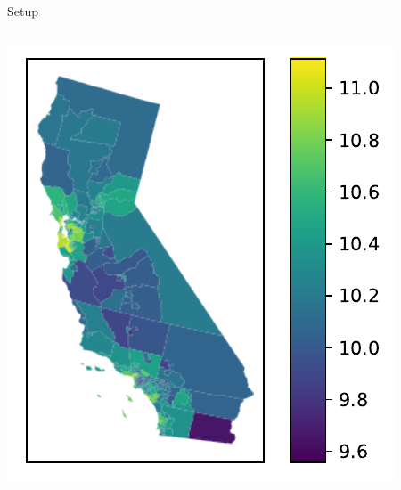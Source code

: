 \documentclass[10.5pt, aspectratio=169]{beamer} %
\begin{document}
\begin{frame}{Setup}
{\begin{columns}
\begin{column}{0.35\textwidth}
\centering
\includegraphics[width=0.95\linewidth]{example_income}
\end{column}

\end{columns}
}

\end{frame}
\end{document}
